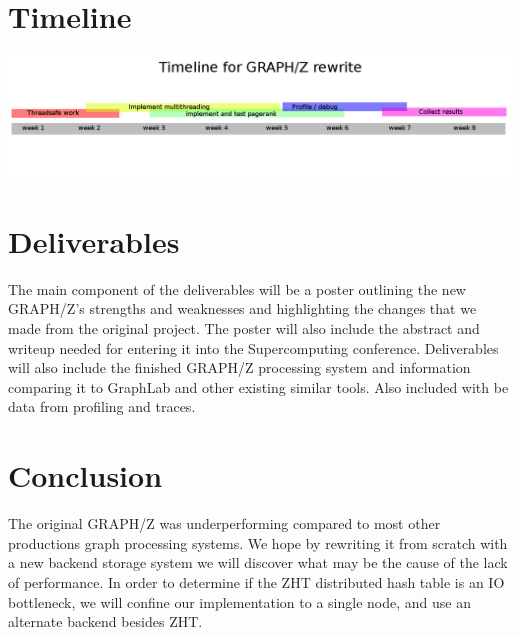 \documentclass[10pt]{article}
\begin{document}
  \section{Timeline}
  \includegraphics[width=\textwidth]{timeline.png}
\begin{multicols}{2}
  \section{Deliverables}
   The main component of the deliverables will be a poster outlining the new GRAPH/Z's strengths and weaknesses and highlighting the changes that we made from the original project. The poster will also include the abstract and writeup needed for entering it into the Supercomputing conference.  Deliverables will also include the finished GRAPH/Z processing system and information comparing it to GraphLab and other existing similar tools. Also included with be data from profiling and traces. 
   \section{Conclusion}
   The original GRAPH/Z was underperforming compared to most other productions graph processing systems. We hope by rewriting it from scratch with a new backend storage system we will discover what may be the cause of the lack of performance. In order to determine if the ZHT distributed hash table is an IO bottleneck, we will confine our implementation to a single node, and use an alternate backend besides ZHT.

   
   
\end{multicols}
\end{document}
